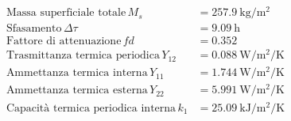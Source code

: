 \begin{flushleft}
\begin{align*}
\text{Massa superficiale totale} \, M_s &= \SI{257.9}{\kilo\gram\per\metre\squared}\\
\text{Sfasamento} \, \Delta\tau &= \SI{9.09}{\hour}\\
\text{Fattore di attenuazione} \, fd &= \SI{0.352}{}\\
\text{Trasmittanza termica periodica} \, Y_{12} &= \SI{0.088}{\watt\per\metre\squared\per\kelvin}\\
\text{Ammettanza termica interna} \, Y_{11} &= \SI{1.744}{\watt\per\metre\squared\per\kelvin}\\
\text{Ammettanza termica esterna} \, Y_{22} &= \SI{5.991}{\watt\per\metre\squared\per\kelvin}\\
\text{Capacità termica periodica interna} \, k_1 &= \SI{25.09}{\kilo\joule\per\metre\squared\per\kelvin}\\
\end{align*}
\end{flushleft}
